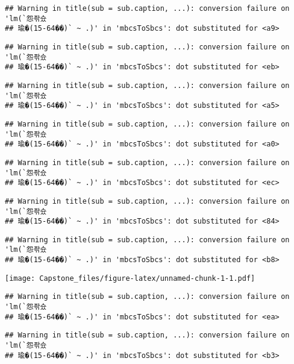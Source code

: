 \documentclass[]{article}
\begin{document}
\begin{verbatim}
## Warning in title(sub = sub.caption, ...): conversion failure on 'lm(`怨좎슜
## 瑜�(15-64��)` ~ .)' in 'mbcsToSbcs': dot substituted for <a9>
\end{verbatim}

\begin{verbatim}
## Warning in title(sub = sub.caption, ...): conversion failure on 'lm(`怨좎슜
## 瑜�(15-64��)` ~ .)' in 'mbcsToSbcs': dot substituted for <eb>
\end{verbatim}

\begin{verbatim}
## Warning in title(sub = sub.caption, ...): conversion failure on 'lm(`怨좎슜
## 瑜�(15-64��)` ~ .)' in 'mbcsToSbcs': dot substituted for <a5>
\end{verbatim}

\begin{verbatim}
## Warning in title(sub = sub.caption, ...): conversion failure on 'lm(`怨좎슜
## 瑜�(15-64��)` ~ .)' in 'mbcsToSbcs': dot substituted for <a0>
\end{verbatim}

\begin{verbatim}
## Warning in title(sub = sub.caption, ...): conversion failure on 'lm(`怨좎슜
## 瑜�(15-64��)` ~ .)' in 'mbcsToSbcs': dot substituted for <ec>
\end{verbatim}

\begin{verbatim}
## Warning in title(sub = sub.caption, ...): conversion failure on 'lm(`怨좎슜
## 瑜�(15-64��)` ~ .)' in 'mbcsToSbcs': dot substituted for <84>
\end{verbatim}

\begin{verbatim}
## Warning in title(sub = sub.caption, ...): conversion failure on 'lm(`怨좎슜
## 瑜�(15-64��)` ~ .)' in 'mbcsToSbcs': dot substituted for <b8>
\end{verbatim}

\texttt{[image: Capstone\_files/figure-latex/unnamed-chunk-1-1.pdf]}

\begin{verbatim}
## Warning in title(sub = sub.caption, ...): conversion failure on 'lm(`怨좎슜
## 瑜�(15-64��)` ~ .)' in 'mbcsToSbcs': dot substituted for <ea>
\end{verbatim}

\begin{verbatim}
## Warning in title(sub = sub.caption, ...): conversion failure on 'lm(`怨좎슜
## 瑜�(15-64��)` ~ .)' in 'mbcsToSbcs': dot substituted for <b3>
\end{verbatim}
\end{document}
